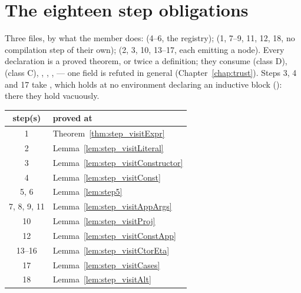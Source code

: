 \section{The eighteen step obligations}
\label{sec:refinement:steps}

Three files, by what the member does:  (4--6, the registry);
 (1, 7--9, 11, 12, 18, no compilation step of their own);
 (2, 3, 10, 13--17, each emitting a \lbox{} node). Every declaration is a proved
theorem, or twice a definition; they consume  (class D),  (class C),
, , ,  --- one
 field is refuted in general (Chapter~\ref{chap:trust}). Steps 3, 4 and 17 take
, which holds at no environment declaring an inductive block ():
there they hold vacuously.

\begin{center}
\begin{tabular}{cl}
\textbf{step(s)} & \textbf{proved at} \\
\hline
1 & Theorem~\ref{thm:step_visitExpr} \\
2 & Lemma~\ref{lem:step_visitLiteral} \\
3 & Lemma~\ref{lem:step_visitConstructor} \\
4 & Lemma~\ref{lem:step_visitConst} \\
5, 6 & Lemma~\ref{lem:step5} \\
7, 8, 9, 11 & Lemma~\ref{lem:step_visitAppArgs} \\
10 & Lemma~\ref{lem:step_visitProj} \\
12 & Lemma~\ref{lem:step_visitConstApp} \\
13--16 & Lemma~\ref{lem:step_visitCtorEta} \\
17 & Lemma~\ref{lem:step_visitCases} \\
18 & Lemma~\ref{lem:step_visitAlt} \\
\hline
\end{tabular}
\end{center}

